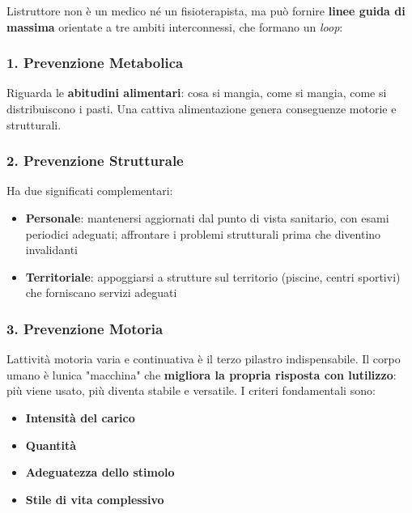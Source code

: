 \documentclass[a4paper,11pt]{article}
\providecommand{\tightlist}{%
  \setlength{\itemsep}{0pt}\setlength{\parskip}{0pt}}
\begin{document}
L\textquotesingle istruttore non è un medico né un fisioterapista, ma
può fornire \textbf{linee guida di massima} orientate a tre ambiti
interconnessi, che formano un \emph{loop}:

\subsubsection{1. Prevenzione Metabolica}\label{prevenzione-metabolica}

Riguarda le \textbf{abitudini alimentari}: cosa si mangia, come si
mangia, come si distribuiscono i pasti. Una cattiva alimentazione genera
conseguenze motorie e strutturali.

\subsubsection{2. Prevenzione
      Strutturale}\label{prevenzione-strutturale}

Ha due significati complementari:

\begin{itemize}
      \tightlist
      \item
            \textbf{Personale}: mantenersi aggiornati dal punto di vista
            sanitario, con esami periodici adeguati; affrontare i problemi
            strutturali prima che diventino invalidanti
      \item
            \textbf{Territoriale}: appoggiarsi a strutture sul territorio
            (piscine, centri sportivi) che forniscano servizi adeguati
\end{itemize}

\subsubsection{3. Prevenzione Motoria}\label{prevenzione-motoria}

L\textquotesingle attività motoria varia e continuativa è il terzo
pilastro indispensabile. Il corpo umano è l\textquotesingle unica
"macchina" che \textbf{migliora la propria risposta con
      l\textquotesingle utilizzo}: più viene usato, più diventa stabile e
versatile. I criteri fondamentali sono:

\begin{itemize}
      \tightlist
      \item
            \textbf{Intensità del carico}
      \item
            \textbf{Quantità}
      \item
            \textbf{Adeguatezza dello stimolo}
      \item
            \textbf{Stile di vita complessivo}
\end{itemize}
\end{document}
